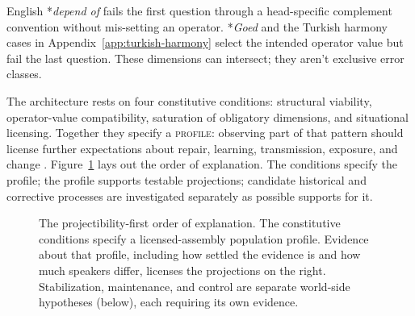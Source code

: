 \documentclass[12pt,letterpaper]{article}
\newcommand{\term}[1]{\textsc{#1}}
\newcommand{\mention}[1]{\textit{#1}}
\begin{document}
{\sloppy English *\mention{depend of} fails the first question through a head-specific complement convention without mis-setting an operator. *\mention{Goed} and the Turkish harmony cases in Appendix~\ref{app:turkish-harmony} select the intended operator value but fail the last question. These dimensions can intersect; they aren't exclusive error classes.\par}

The architecture rests on four constitutive conditions: structural viability,
operator-value compatibility, saturation of obligatory dimensions, and
situational licensing. Together they specify a \term{profile}: observing part
of that pattern should license further expectations about repair, learning,
transmission, exposure, and change \autocite{reynolds2026kindsProjectibilityProfiles}.
Figure~\ref{fig:profile-spine} lays out the order of explanation. The conditions
specify the profile; the profile supports testable projections; candidate
historical and corrective processes are investigated separately as possible
supports for it.

\begin{figure}[t]
\centering
{}
\caption{The projectibility-first order of explanation. The constitutive
conditions specify a licensed-assembly population profile. Evidence about that
profile, including how settled the evidence is and how much speakers differ,
licenses the
projections on the right. Stabilization, maintenance, and control are separate
world-side hypotheses (below), each requiring its own evidence.}
\label{fig:profile-spine}
\end{figure}
\end{document}
